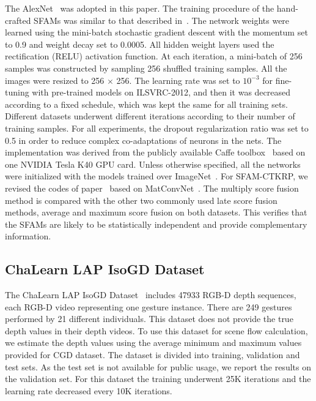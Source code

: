 \documentclass[10pt,twocolumn,letterpaper]{article}
\begin{document}
The AlexNet~\cite{krizhevsky2012imagenet} was adopted in this paper. 
The training procedure of the hand-crafted SFAMs was similar to that described 
in~\cite{krizhevsky2012imagenet}. The network weights were learned using 
the mini-batch stochastic gradient descent with the momentum set to 0.9 
and weight decay set to 0.0005. All hidden weight layers used the 
rectification (RELU) activation function. At each iteration, a mini-batch of 256 
samples was constructed by sampling 256 shuffled training samples. All the images 
were resized to 256 $\times$ 256. The learning rate was set to $10^{-3}$ for 
fine-tuning with pre-trained models on ILSVRC-2012, and then it was decreased 
according to a fixed schedule, which was kept the same for all training sets. 
Different datasets underwent different iterations according to their number of 
training samples. For all experiments, the dropout regularization ratio was set 
to 0.5 in order to reduce complex co-adaptations of neurons in the nets. The 
implementation was derived from the publicly available Caffe 
toolbox~\cite{jia2014caffe} based on one {NVIDIA Tesla K40 GPU} card. Unless 
otherwise specified, all the networks were initialized with the models trained 
over ImageNet~\cite{krizhevsky2012imagenet}. For SFAM-CTKRP, we revised the 
codes of paper~\cite{bilen2016dynamic} based on 
MatConvNet~\cite{vedaldi15matconvnet}. The multiply score fusion method is compared with the other two commonly used late score fusion methods, average  and maximum score fusion on both datasets. This verifies that the SFAMs are likely to be statistically independent and provide complementary information. 

\subsection{ChaLearn LAP IsoGD Dataset} The ChaLearn LAP IsoGD 
Dataset~\cite{wanchalearn} includes 
47933 RGB-D depth sequences, each RGB-D video representing one gesture instance. 
There are 249 gestures performed by 21 different individuals. This dataset does 
not provide the true depth values in their depth videos. To use this dataset for 
scene flow calculation, we estimate the depth values using the average minimum 
and maximum values provided for CGD dataset.  The dataset is divided into 
training, validation and test sets. As the test set is not available 
for public usage, we report the results on the validation set. For this dataset 
the training underwent 25K iterations and the learning rate decreased every 10K 
iterations.
\end{document}
